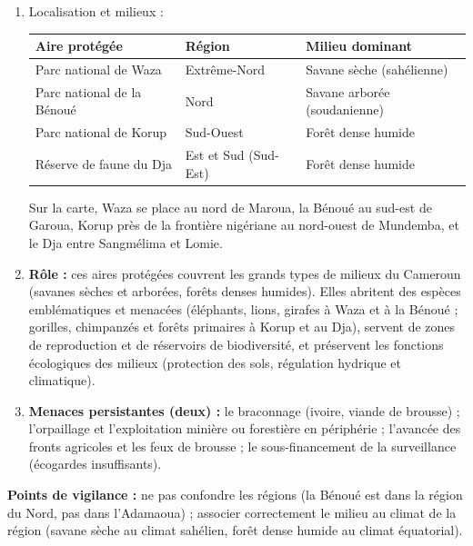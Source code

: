 \documentclass[11pt]{article}
\begin{document}
\begin{corrige}
\begin{enumerate}
\item Localisation et milieux :
\begin{center}
\begin{tabularx}{\linewidth}{|l|X|X|}\hline
\rowcolor{popblueL} \textbf{Aire protégée} & \textbf{Région} & \textbf{Milieu dominant} \\ \hline
Parc national de Waza & Extrême-Nord & Savane sèche (sahélienne) \\ \hline
Parc national de la Bénoué & Nord & Savane arborée (soudanienne) \\ \hline
Parc national de Korup & Sud-Ouest & Forêt dense humide \\ \hline
Réserve de faune du Dja & Est et Sud (Sud-Est) & Forêt dense humide \\ \hline
\end{tabularx}
\end{center}
Sur la carte, Waza se place au nord de Maroua, la Bénoué au sud-est de Garoua, Korup près de la frontière nigériane au nord-ouest de Mundemba, et le Dja entre Sangmélima et Lomie.
\item \textbf{Rôle :} ces aires protégées couvrent les grands types de milieux du Cameroun (savanes sèches et arborées, forêts denses humides). Elles abritent des espèces emblématiques et menacées (éléphants, lions, girafes à Waza et à la Bénoué ; gorilles, chimpanzés et forêts primaires à Korup et au Dja), servent de zones de reproduction et de réservoirs de biodiversité, et préservent les fonctions écologiques des milieux (protection des sols, régulation hydrique et climatique).
\item \textbf{Menaces persistantes (deux) :} le braconnage (ivoire, viande de brousse) ; l'orpaillage et l'exploitation minière ou forestière en périphérie ; l'avancée des fronts agricoles et les feux de brousse ; le sous-financement de la surveillance (écogardes insuffisants).
\end{enumerate}
\textbf{Points de vigilance :} ne pas confondre les régions (la Bénoué est dans la région du Nord, pas dans l'Adamaoua) ; associer correctement le milieu au climat de la région (savane sèche au climat sahélien, forêt dense humide au climat équatorial).
\end{corrige}
\end{document}

